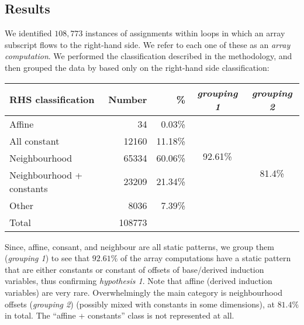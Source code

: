 \subsection{Results}



\noindent
We identified $108,773$ instances of assignments within loops in
which an array subscript flows to the right-hand side. We refer
to each one of these as an \emph{array computation}.
We performed the classification described in the methodology,
and then grouped the data by based only on the right-hand side
classification:
\begin{center}
\begin{tabular}{lrrcc}
\textbf{RHS classification} & \textbf{Number} & \textbf{\%} &
\textit{grouping 1} & \textit{grouping 2} \\ \hline
Affine                          & 34        & 0.03\%  &
                                                            \multirow{4}{*}{92.61\%}
  \\ \cline{1-3}\cline{5-5}
All constant                    & 12160     & 11.18\%  \\ \cline{1-3}\cline{5-5}
Neighbourhood                   & 65334     & 60.06\% &
                                                          & \multirow{2}{*}{81.4\%}
                                                           \\ \cline{1-3}
Neighbourhood + constants       & 23209     & 21.34\%  \\ \hline
Other                           & 8036      & 7.39\%  \\ \hline \hline
Total                           & 108773    &  \\
\end{tabular}
\end{center}

\noindent
Since, affine, consant, and neighbour are all static patterns, we
group them (\textit{grouping 1}) to see that $92.61\%$ of the array computations have
a static pattern that are either constants or constant of offsets
of base/derived induction variables, thus confirming
\emph{hypothesis 1}. Note that affine (derived induction variables) are very
rare. Overwhelmingly the main category is neighbourhood offsets
(\emph{grouping 2})
(possibly mixed with constants in some dimensions), at $81.4\%$ in
total. The ``affine + constants'' class is not represented at all.